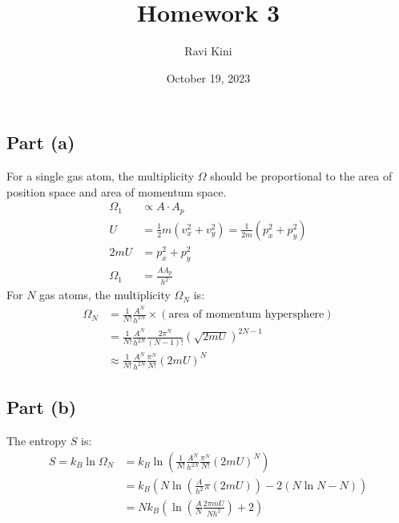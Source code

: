 \documentclass{article}
\title{Homework 3}
\author{Ravi Kini}
\date{October 19, 2023}
\begin{document}
\maketitle

\subsection*{Part (a)}
For a single gas atom, the multiplicity $\Omega$ should be proportional to the area of position space and area of momentum space.
\begin{equation}
    \begin{split}
        \Omega_1 & \propto A \cdot A_p \\
        U & = \frac{1}{2}m\left(v_x^2 + v_y^2\right) = \frac{1}{2m}\left(p_x^2 + p_y^2\right) \\
        2mU & = p_x^2 + p_y^2 \\
        \Omega_1 & = \frac{AA_p}{h^2}
    \end{split}
\end{equation}
For $N$ gas atoms, the multiplicity $\Omega_N$ is:
\begin{equation}
    \begin{split}
        \Omega_N & = \frac{1}{N!}\frac{A^N}{h^{2N}} \times \left(\text{area of momentum hypersphere}\right) \\
        & = \frac{1}{N!}\frac{A^N}{h^{2N}} \frac{2\pi^N}{\left(N - 1\right)!}{\left(\sqrt{2mU}\right)}^{2N - 1} \\
        & \approx \frac{1}{N!}\frac{A^N}{h^{2N}} \frac{\pi^N}{N!}{\left(2mU\right)}^N
    \end{split}
\end{equation}
\subsection*{Part (b)}
The entropy $S$ is:
\begin{equation}
    \begin{split}
        S = k_B\ln\Omega_N & = k_B\ln\left(\frac{1}{N!}\frac{A^N}{h^{2N}} \frac{\pi^N}{N!}{\left(2mU\right)}^N\right) \\
        & = k_B\left(N\ln\left(\frac{A}{h^{2}} \pi\left(2mU\right)\right) - 2\left(N\ln N - N\right)\right) \\
        & = Nk_B\left(\ln\left(\frac{A}{N}\frac{2\pi mU}{Nh^{2}}\right) + 2\right) \\
    \end{split}
\end{equation}
\end{document}
